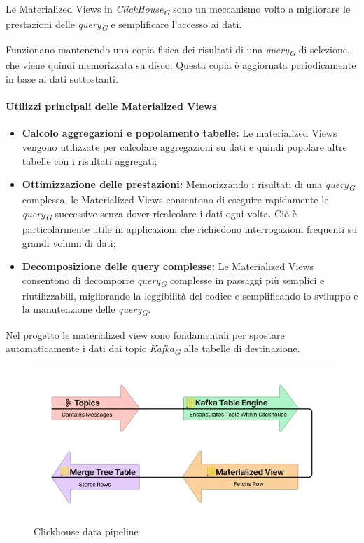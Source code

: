 Le Materialized Views in \textit{ClickHouse}\textsubscript{\textit{G}} sono un meccanismo volto a migliorare le prestazioni delle \textit{query}\textsubscript{\textit{G}} e semplificare l'accesso ai dati.

Funzionano mantenendo una copia fisica dei risultati di una \textit{query}\textsubscript{\textit{G}} di selezione, che viene quindi memorizzata su disco. Questa copia è aggiornata periodicamente in base ai dati sottostanti.

\paragraph{Utilizzi principali delle Materialized Views}
\begin{itemize}
    \item \textbf{Calcolo aggregazioni e popolamento tabelle:} Le materialized Views vengono utilizzate per calcolare aggregazioni su dati e quindi popolare altre tabelle con i risultati aggregati;
    \item \textbf{Ottimizzazione delle prestazioni:} Memorizzando i risultati di una \textit{query}\textsubscript{\textit{G}} complessa, le Materialized Views consentono di eseguire rapidamente le \textit{query}\textsubscript{\textit{G}} successive senza dover ricalcolare i dati ogni volta. Ciò è particolarmente utile in applicazioni che richiedono interrogazioni frequenti su grandi volumi di dati;
    \item \textbf{Decomposizione delle query complesse:} Le Materialized Views consentono di decomporre \textit{query}\textsubscript{\textit{G}} complesse in passaggi più semplici e riutilizzabili, migliorando la leggibilità del codice e semplificando lo sviluppo e la manutenzione delle \textit{query}\textsubscript{\textit{G}}.
\end{itemize}

Nel progetto le materialized view sono fondamentali per spostare automaticamente i dati dai topic \textit{Kafka}\textsubscript{\textit{G}} alle tabelle di destinazione.
\begin{figure}[H]
  \centering
  \includegraphics[width=1\textwidth]{../Images/SpecificaTecnica/enginePipeline.jpg}
  \caption{Clickhouse data pipeline}
  \label{fig:data_pipeline_clickhouse}
\end{figure}

